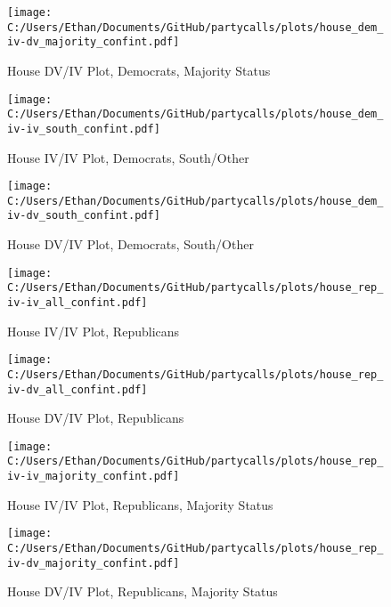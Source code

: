 \documentclass[12pt]{article}
\begin{document}
\begin{figure}[H]
	\centering
	\caption{House DV/IV Plot, Democrats, Majority Status}
	\texttt{[image: C:/Users/Ethan/Documents/GitHub/partycalls/plots/house\_dem\_iv-dv\_majority\_confint.pdf]}
\end{figure}

\begin{figure}[H]
	\centering
	\caption{House IV/IV Plot, Democrats, South/Other}
	\texttt{[image: C:/Users/Ethan/Documents/GitHub/partycalls/plots/house\_dem\_iv-iv\_south\_confint.pdf]}
\end{figure}

\begin{figure}[H]
	\centering
	\caption{House DV/IV Plot, Democrats, South/Other}
	\texttt{[image: C:/Users/Ethan/Documents/GitHub/partycalls/plots/house\_dem\_iv-dv\_south\_confint.pdf]}
\end{figure}

\begin{figure}[H]
	\centering
	\caption{House IV/IV Plot, Republicans}
	\texttt{[image: C:/Users/Ethan/Documents/GitHub/partycalls/plots/house\_rep\_iv-iv\_all\_confint.pdf]}
\end{figure}

\begin{figure}[H]
	\centering
	\caption{House DV/IV Plot, Republicans}
	\texttt{[image: C:/Users/Ethan/Documents/GitHub/partycalls/plots/house\_rep\_iv-dv\_all\_confint.pdf]}
\end{figure}

\begin{figure}[H]
	\centering
	\caption{House IV/IV Plot, Republicans, Majority Status}
	\texttt{[image: C:/Users/Ethan/Documents/GitHub/partycalls/plots/house\_rep\_iv-iv\_majority\_confint.pdf]}
\end{figure}

\begin{figure}[H]
	\centering
	\caption{House DV/IV Plot, Republicans, Majority Status}
	\texttt{[image: C:/Users/Ethan/Documents/GitHub/partycalls/plots/house\_rep\_iv-dv\_majority\_confint.pdf]}
\end{figure}
\end{document}
